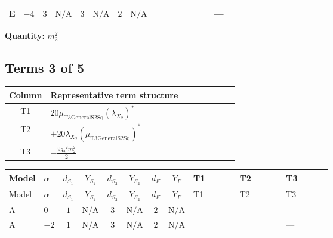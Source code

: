 \documentclass[8pt]{article}
\begin{document}
\begin{landscape}
\begin{longtable}{@{}llcccccc >{\raggedright\arraybackslash}p{0.21\linewidth} >{\raggedright\arraybackslash}p{0.21\linewidth} >{\raggedright\arraybackslash}p{0.21\linewidth}@{}}
\midrule
E & $-4$ & $3$ & $\text{N/A}$ & $3$ & $\text{N/A}$ & $2$ & $\text{N/A}$ & \scriptsize\adjustbox{max width=\linewidth}{$\begin{gathered} -6 {g_1}^2 {m_2^2}\end{gathered}$} & --- & \scriptsize\adjustbox{max width=\linewidth}{$\begin{gathered} +{m_2^2} (8 {\lambda_{S_2}^{(1)}}+4 {\lambda_{S_2}^{(A)}})\end{gathered}$} \\
\midrule
\bottomrule
\end{longtable}
\clearpage
\noindent\textbf{Quantity: }$m_2^2$\par\smallskip
\subsection*{Terms 3 of 5}
\begin{center}
\begin{tabular}{@{}c >{\raggedright\arraybackslash}p{0.82\linewidth}@{}}
\toprule
Column & Representative term structure \\
\midrule
T1 & \(\displaystyle 20 {\mu_{\mathrm{T3GeneralS2Sq}}} \left({\lambda_{X_{2}}}\right)^{*}\) \\
\midrule
T2 & \(\displaystyle +20 {\lambda_{X_{2}}} \left({\mu_{\mathrm{T3GeneralS2Sq}}}\right)^{*}\) \\
\midrule
T3 & \(\displaystyle -\frac{9 {g_2}^2 {m_2^2}}{2}\) \\
\midrule
\bottomrule
\end{tabular}
\end{center}
\smallskip
\tiny
\begin{longtable}{@{}llcccccc >{\raggedright\arraybackslash}p{0.21\linewidth} >{\raggedright\arraybackslash}p{0.21\linewidth} >{\raggedright\arraybackslash}p{0.21\linewidth}@{}}
\toprule
Model & $\alpha$ & $d_{S_1}$ & $Y_{S_1}$ & $d_{S_2}$ & $Y_{S_2}$ & $d_F$ & $Y_F$ & T1 & T2 & T3 \\
\midrule
\endfirsthead
\toprule
Model & $\alpha$ & $d_{S_1}$ & $Y_{S_1}$ & $d_{S_2}$ & $Y_{S_2}$ & $d_F$ & $Y_F$ & T1 & T2 & T3 \\
\midrule
\endhead
A & $0$ & $1$ & $\text{N/A}$ & $3$ & $\text{N/A}$ & $2$ & $\text{N/A}$ & --- & --- & --- \\
\midrule
A & $-2$ & $1$ & $\text{N/A}$ & $3$ & $\text{N/A}$ & $2$ & $\text{N/A}$ & \scriptsize\adjustbox{max width=\linewidth}{$\begin{gathered} 20 {\mu_{\mathrm{T3GeneralS2Sq}}} \left({\lambda_{X_{2}}}\right)^{*}\end{gathered}$} & \scriptsize\adjustbox{max width=\linewidth}{$\begin{gathered} +20 {\lambda_{X_{2}}} \left({\mu_{\mathrm{T3GeneralS2Sq}}}\right)^{*}\end{gathered}$} & --- \\

\end{longtable}
\end{landscape}
\end{document}
